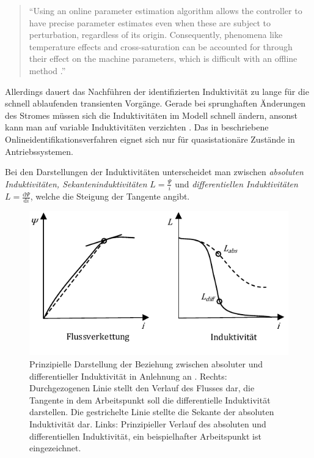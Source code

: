 \documentclass[conference,twocolumn]{IEEEtran}
\newcommand{\x}[1]{\mathrm{#1}}
\begin{document}
\begin{quote}
\enquote{Using an online parameter estimation algorithm allows the controller to have precise parameter estimates even when these are subject to perturbation, regardless of its origin. Consequently, phenomena like temperature effects and cross-saturation can be accounted for through their effect on the machine parameters, which is difficult with an offline method \autocite[S.~1]{underwood_online_2010}.}
\end{quote}

Allerdings dauert das Nachführen der identifizierten Induktivität zu lange für die schnell ablaufenden transienten Vorgänge.
Gerade bei sprunghaften Änderungen des Stromes müssen sich die Induktivitäten im Modell schnell ändern, ansonst kann man auf variable Induktivitäten verzichten \autocite{Kellner2012}.
Das in \autocite{underwood_online_2010} beschriebene Onlineidentifikationsverfahren eignet sich nur für quasistationäre Zustände in Antriebssystemen.

Bei den Darstellungen der Induktivitäten unterscheidet man zwischen \emph{absoluten Induktivitäten, Sekanteninduktivitäten} $L = \frac{\Psi}{i}$ und \emph{differentiellen Induktivitäten} $L = \frac{\x{d}\Psi}{\x{d}i}$, welche die Steigung der Tangente angibt.

\begin{figure}[!h]
\centering
\includegraphics[width=\columnwidth]{img/induktiv}
\caption{Prinzipielle Darstellung der Beziehung zwischen absoluter und differentieller Induktivität in Anlehnung an \textcite[S.~2]{kellner_general_2011}. Rechts: Durchgezogenen Linie stellt den Verlauf des Flusses dar, die Tangente in dem Arbeitspunkt soll die differentielle Induktivität darstellen. Die gestrichelte Linie stellte die Sekante der absoluten Induktivität dar. Links: Prinzipieller Verlauf des absoluten und differentiellen Induktivität, ein beispielhafter Arbeitspunkt ist eingezeichnet.}
\label{fig:induktiv}
\end{figure}
\end{document}
